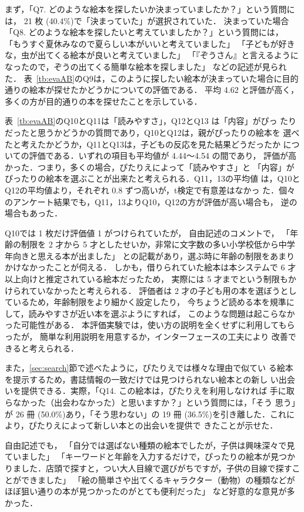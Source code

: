 \documentclass[japanese]{jnlp_1.4}
\begin{document}
まず，「Q7. どのような絵本を探したいか決まっていましたか？」という質問には，
21 枚 (40.4\%)で「決まっていた」が選択されていた．
決まっていた場合
「Q8. どのような絵本を探したいと考えていましたか？」という質問には，
「もうすぐ夏休みなので夏らしい本がいいと考えていました」
「子どもが好きな，虫が出てくる絵本が良いと考えていました」
「『ぞうさん』と言えるようになったので，ぞうの出てくる簡単な絵本を探しました」
などの記述が見られた．
表~\ref{tb:evaAB}のQ9は，このように探したい絵本が決まっていた場合に目的通りの絵本が探せたかどうかについての評価である．
平均 4.62 と評価が高く，多くの方が目的通りの本を探せたことを示している．

表~\ref{tb:evaAB}のQ10とQ11は「読みやすさ」，Q12とQ13 は「内容」がぴっ
たりだったと思うかどうかの質問であり，Q10とQ12は，親がぴったりの絵本を
選べたと考えたかどうか，Q11とQ13は，子どもの反応を見た結果どうだったか
についての評価である．いずれの項目も平均値が 4.44〜4.54 の間であり，
評価が高かった．つまり，多くの場合，ぴたりえによって「読みやすさ」と
「内容」がぴったりの絵本を選ぶことが出来たと考えられる．Q11，13の平均値
は，Q10とQ12の平均値より，それぞれ 0.8 ずつ高いが，t検定で有意差はなかっ
た．個々のアンケート結果でも，Q11，13よりQ10，Q12の方が評価が高い場合も，
逆の場合もあった．

Q10では 1 枚だけ評価値 1 がつけられていたが，
自由記述のコメントで，
「年齢の制限を 2 才から 5 才としたせいか，非常に文字数の多い小学校低から中学年向きと思える本が出ました」
との記載があり，選ぶ時に年齢の制限をあまりかけなかったことが伺える．
しかも，借りられていた絵本は本システムで 6 才以上向けと推定されている絵本だったため，
実際には 5 才までという制限もかけられていなかったと考えられる．
評価者は 2 才の子ども用の本を選ぼうとしているため，年齢制限をより細かく設定したり，
今ちょうど読める本を規準にして，読みやすさが近い本を選ぶようにすれば，
このような問題は起こらなかった可能性がある．
本評価実験では，使い方の説明を全くせずに利用してもらったが，
簡単な利用説明を用意するか，インターフェースの工夫により
改善できると考えられる．

また，\ref{sec:search}節で述べたように，ぴたりえでは様々な理由で似てい
る絵本を提示するため，書誌情報の一致だけでは見つけられない絵本との新し
い出会いを提供できる．実際，「Q14. この絵本は，ぴたりえを利用しなければ
手に取らなかった（出会わなかった）と思いますか？」という質問には，「そう
思う」が 26 冊 (50.0\%)あり，「そう思わない」の 19 冊 (36.5\%)を引き離した．これにより，ぴたりえによって新しい本との出会いを提供で
きたことが示せた．


自由記述でも，
「自分では選ばない種類の絵本でしたが，子供は興味深々で見ていました」
「キーワードと年齢を入力するだけで，ぴったりの絵本が見つかりました．店頭で探すと，つい大人目線で選びがちですが，子供の目線で探すことができました」
「絵の簡単さや出てくるキャラクター（動物）の種類などがほぼ狙い通りの本が見つかったのがとても便利だった」
など好意的な意見が多かった．
\end{document}
